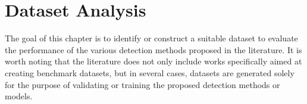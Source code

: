 \chapter{Dataset Analysis}

\justifying
The goal of this chapter is to identify or construct a suitable 
dataset to evaluate the performance of the various detection methods 
proposed in the literature. It is worth noting that the literature does 
not only include works specifically aimed at creating benchmark datasets, 
but in several cases, datasets are generated solely for the purpose of 
validating or training the proposed detection methods or models.




